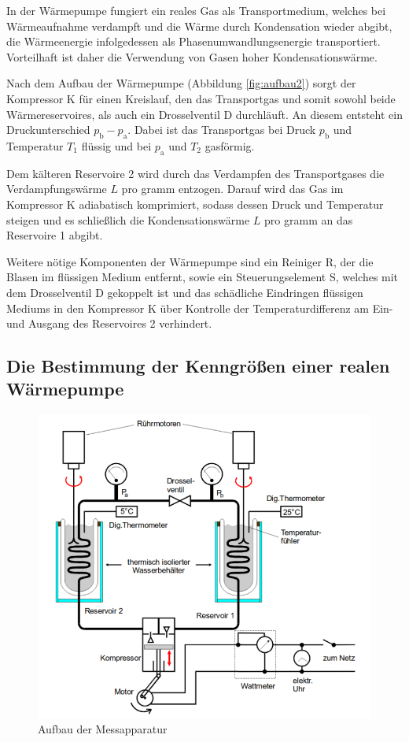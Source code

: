 In der Wärmepumpe fungiert ein reales Gas als Transportmedium, welches 
bei Wärmeaufnahme verdampft und die Wärme durch Kondensation wieder abgibt, 
die Wärmeenergie infolgedessen als Phasenumwandlungsenergie transportiert.
Vorteilhaft ist daher die Verwendung von Gasen hoher Kondensationswärme. 

Nach dem Aufbau der Wärmepumpe 
(Abbildung \ref{fig:aufbau2}) sorgt der Kompressor K für einen Kreislauf, den das Transportgas 
und somit sowohl beide Wärmereservoires, als auch ein Drosselventil D 
durchläuft. An diesem entsteht ein Druckunterschied $p_\text{b} - p_\text{a}$. 
Dabei ist das Transportgas bei Druck $p_\text{b}$ und Temperatur $T_1$ flüssig 
und bei $p_\text{a}$ und $T_2$ gasförmig.

Dem kälteren Reservoire 2 wird durch das Verdampfen des Transportgases 
die Verdampfungswärme $L$ pro gramm entzogen. Darauf wird das Gas im 
Kompressor K adiabatisch komprimiert, sodass dessen Druck und Temperatur steigen
und es schließlich die Kondensationswärme $L$ pro gramm an das Reservoire 1 abgibt.

Weitere nötige Komponenten der Wärmepumpe sind ein Reiniger R, der die Blasen 
im flüssigen Medium entfernt, sowie ein Steuerungselement S, welches mit dem 
Drosselventil D gekoppelt ist und das schädliche Eindringen flüssigen 
Mediums in den Kompressor K über Kontrolle der Temperaturdifferenz am Ein- 
und Ausgang des Reservoires 2 verhindert.

\subsection{Die Bestimmung der Kenngrößen einer realen Wärmepumpe}

\begin{figure}
    \centering
    \includegraphics[width=\textwidth]{aufbau.pdf}
    \caption{Aufbau der Messapparatur}
    \label{fig:aufbau}
\end{figure}

